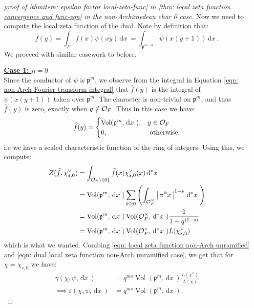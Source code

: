 \documentclass[11pt, x11names, openany]{book}
\newcommand{\pp}{\mathfrak{p}}
\newcommand{\set}[1]{\left\{ #1 \right\}}
\renewcommand{\brack}[1]{\left(   #1 \right)}
\newcommand{\abs}[1]{\left| \, #1  \,\right|}
\renewcommand{\hat}{\widehat}
\newcommand{\dx}{\, \mathrm{d}x \ }
\renewcommand{\d}[1]{\, \mathrm{d}#1 \ }
\DeclareMathOperator{\vol}{Vol}
\begin{document}
\begin{proof}[proof of \ref{thmitem: epsilon factor local-zeta-func} in \ref{thm: local zeta function convergence and func-eqn} in the non-Archimedean char 0 case]
Now we need to compute the local zeta function of the dual. Note by definition that:
\begin{equation}
\label{eqn: non-Arch Fourier transform integral}
    \hat{f}(y) = \int_F f(x)\psi(xy) \dx = \int_{\pp^{m-n}} \psi(x(y+1)) \dx. 
\end{equation}
We proceed with similar casework to before.

\underline{\textbf{Case 1: $n=0$}}\\
Since the conductor of $\psi$ is $\pp^m$, we observe from the integral in Equation \ref{eqn: non-Arch Fourier transform integral} that $\hat{f}(y)$ is the integral of $\psi(x(y+1))$ taken over $\pp^m$. The character is non-trivial on $\pp^m$, and thus $\hat{f}(y)$ is zero, exactly when $y \notin \mathcal{O}_F$. Thus in this case we have:
\begin{equation*}
    \hat{f}(y) = \begin{cases}
    \vol(\pp^m, \dx), & y \in \calo_F\\
    0, & \text{ otherwise},
    \end{cases}
\end{equation*}
i.e we have a scaled characteristic function of the ring of integers. Using this, we compute:
\begin{align}
\label{eqn: dual local zeta function non-Arch unramified case}
    Z(\hat{f}, \chi^\lor_{s, 0}) &= \int_{\calo_F \setminus \set{0}} \hat{f}(x) \chi^\lor_{s, 0}(x) \d{^*x} \nonumber \\
    &= \vol(\pp^m, \dx) \sum_{k \geq 0} \brack{\int_{\calo_F^\times} \abs{\pi^k x}^{1-s} \d{^*x}} \nonumber \\
    &= \vol(\pp^m, \dx) \vol(\calo_F^\times, \d{^*x}) \frac{1}{1 - q^{(1-s)}} \nonumber \\
    &= \vol(\pp^m, \dx) \vol(\calo_F^\times, \d{^*x}) L(\chi^\lor_{s, 0})
\end{align}
which is what we wanted. Combing \ref{eqn: local zeta function non-Arch unramified} and \ref{eqn: dual local zeta function non-Arch unramified case}, we get that for $\chi = \chi_{s, 0}$ we have:
\begin{align}
\label{eqn: local epsilon factor non-Arch unramified}
    \gamma(\chi, \psi, \dx) &= q^{ms} \vol(\pp^m, \dx) \frac{L(\chi^\lor)}{L(\chi)} \nonumber \\
    \implies \varepsilon(\chi, \psi, \dx) &= q^{ms}\vol(\pp^m, \dx).
\end{align}


\end{proof}
\end{document}
